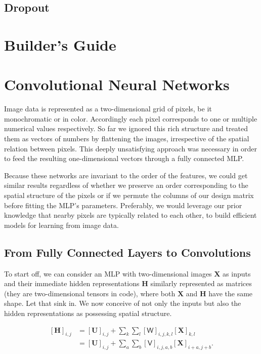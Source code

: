 \documentclass[a4paper,12pt]{article}
\theoremstyle{definition}
\begin{document}
\subsection*{Dropout}

\section{Builder's Guide}

\section{Convolutional Neural Networks}
Image data is represented as a two-dimensional grid of pixels, be it monochromatic or in color. Accordingly each pixel corresponds to one or multiple numerical values
respectively. So far we ignored this rich structure and treated them as vectors of numbers by flattening the images, irrespective of the spatial relation between pixels.
This deeply unsatisfying approach was necessary in order to feed the resulting one-dimensional vectors through a fully connected MLP.

Because these networks are invariant to the order of the features, we could get similar results regardless of whether we preserve an order corresponding to the spatial
structure of the pixels or if we permute the columns of our design matrix before fitting the MLP’s parameters. Preferably, we would leverage our prior knowledge that
nearby pixels are typically related to each other, to build efficient models for learning from image data.
\subsection*{From Fully Connected Layers to Convolutions}

To start off, we can consider an MLP with two-dimensional images $\mathbf{X}$ as inputs and their immediate hidden representations $\mathbf{H}$  similarly represented
as matrices (they are two-dimensional tensors in code), where both $\mathbf{X}$ and $\mathbf{H}$ have the same shape. Let that sink in. We now conceive of not only the
inputs but also the hidden representations as possessing spatial structure.


\begin{equation*}
    \begin{aligned}
        [\mathbf{H}]_{i, j} & = [\mathbf{U}]_{i, j} + \sum_k \sum_l[\mathsf{W}]_{i, j, k, l}  [\mathbf{X}]_{k, l} \\ &=  [\mathbf{U}]_{i, j} +
        \sum_a \sum_b [\mathsf{V}]_{i, j, a, b}  [\mathbf{X}]_{i+a, j+b}.
    \end{aligned}
\end{equation*}
\end{document}
